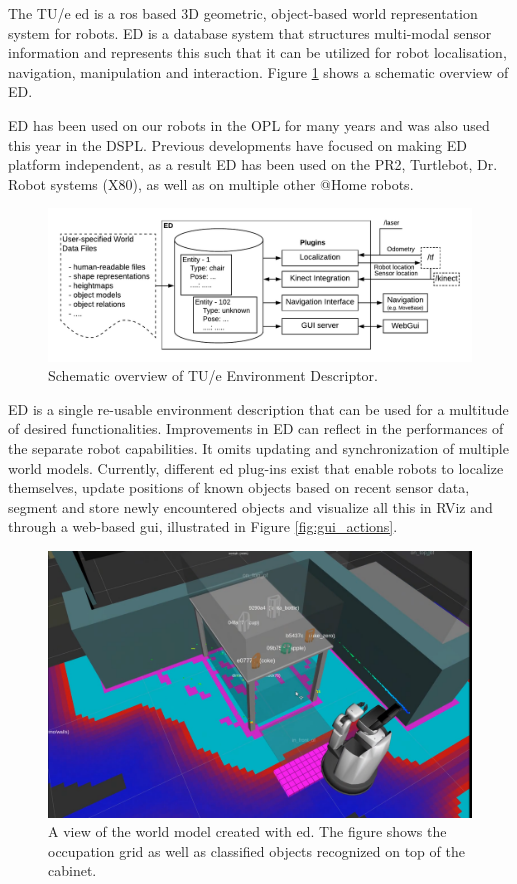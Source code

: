 \label{sec:ed}
The TU/e \acrfull{ed} is a \acrfull{ros} based 3D geometric, object-based world representation system for robots. ED is a database system that structures multi-modal sensor information and represents this such that it can be utilized for robot localisation, navigation, manipulation and interaction. Figure \ref{fig:ed} shows a schematic overview of ED.

ED has been used on our robots in the OPL for many years and was also used this year in the DSPL. Previous developments have focused on making ED platform independent, as a result ED has been used on the PR2, Turtlebot, Dr. Robot systems (X80), as well as on multiple other @Home robots.
\begin{figure}[h]
	\includegraphics[width = 0.9\linewidth]{Figures/ed_overview}
	\caption{Schematic overview of TU/e Environment Descriptor.}
	\label{fig:ed}
\end{figure}
ED is a single re-usable environment description that can be used for a multitude of desired functionalities. Improvements in ED can reflect in the performances of the separate robot capabilities. It omits updating and synchronization of multiple world models. Currently, different \acrshort{ed} plug-ins exist that enable robots to localize themselves, update positions of known objects based on recent sensor data, segment and store newly encountered objects and visualize all this in RViz and through a web-based \acrshort{gui}, illustrated in Figure \ref{fig:gui_actions}.
\begin{figure}[h]
\centering
	\includegraphics[width = 0.8\linewidth]{Figures/ed_segmentation_hsr}
	\caption{A view of the world model created with \acrshort{ed}. The figure shows the occupation grid as well as classified objects recognized on top of the cabinet.}
	\label{fig:ed_segmentation}
\end{figure}
